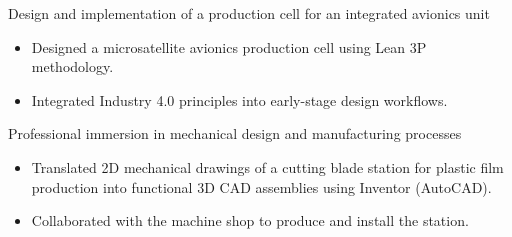 \documentclass[10pt,a4paper,ragged2e,withhyper]{altacv}
\begin{document}
\divider

\textcolor{myRed}{Design and implementation of a production cell for an integrated avionics unit}
\begin{itemize}[leftmargin=1.5em]
  \item Designed a microsatellite avionics production cell using Lean 3P methodology.
  \item Integrated Industry 4.0 principles into early-stage design workflows.
\end{itemize}

\divider

\textcolor{myRed}{Professional immersion in mechanical design and manufacturing processes}
\begin{itemize}[leftmargin=1.5em]
  \item Translated 2D mechanical drawings of a cutting blade station for plastic film production into functional 3D CAD assemblies using Inventor (AutoCAD).
  \item Collaborated with the machine shop to produce and install the station.
\end{itemize}

\medskip








\end{document}
